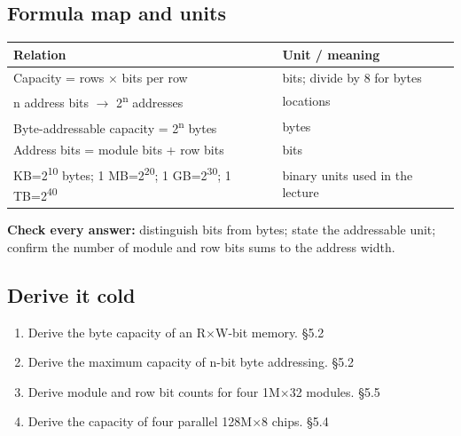 \documentclass[11pt]{article}
\begin{document}
\begin{keepsection}
\section{Formula map and units}

\begin{center}\small\begin{tabularx}{\linewidth}{>{\raggedright\arraybackslash}X>{\raggedright\arraybackslash}X}\toprule
\textbf{Relation} & \textbf{Unit / meaning} \\ \midrule
Capacity = rows \ensuremath{\times} bits per row & bits; divide by 8 for bytes \\
n address bits \ensuremath{\to} 2\textsuperscript{n} addresses & locations \\
Byte-addressable capacity = 2\textsuperscript{n} bytes & bytes \\
Address bits = module bits + row bits & bits \\
1 KB=2\textsuperscript{10} bytes; 1 MB=2\textsuperscript{20}; 1 GB=2\textsuperscript{30}; 1 TB=2\textsuperscript{40} & binary units used in the lecture \\
\bottomrule\end{tabularx}\end{center}

\begin{notebox}\textbf{Check every answer:} distinguish bits from bytes; state the addressable unit; confirm the number of module and row bits sums to the address width.\end{notebox}
\end{keepsection}

\begin{keepsection}
\section{Derive it cold}

\begin{enumerate}
\item Derive the byte capacity of an R\ensuremath{\times}W-bit memory. \hfill{\small\color{FAUblue}§5.2}
\item Derive the maximum capacity of n-bit byte addressing. \hfill{\small\color{FAUblue}§5.2}
\item Derive module and row bit counts for four 1M\ensuremath{\times}32 modules. \hfill{\small\color{FAUblue}§5.5}
\item Derive the capacity of four parallel 128M\ensuremath{\times}8 chips. \hfill{\small\color{FAUblue}§5.4}
\end{enumerate}
\end{keepsection}
\end{document}
